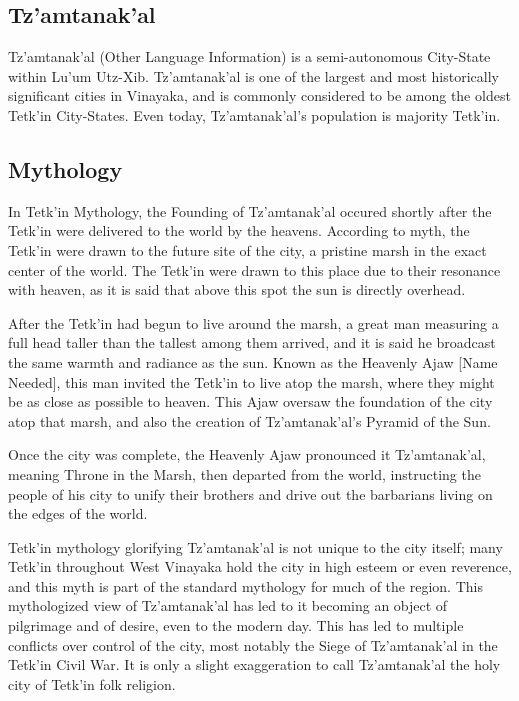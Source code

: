 \begin{multicols}{2}
	\section{Tz'amtanak'al}
		Tz'amtanak'al (Other Language Information) is a semi-autonomous City-State within Lu'um Utz-Xib. Tz'amtanak'al is one of the largest and most historically significant cities in Vinayaka, and is commonly considered to be among the oldest Tetk'in City-States. Even today, Tz'amtanak'al's population is majority Tetk'in.
		\subsection{Mythology}
		In Tetk'in Mythology, the Founding of Tz'amtanak'al occured shortly after the Tetk'in were delivered to the world by the heavens. According to myth, the Tetk'in were drawn to the future site of the city, a pristine marsh in the exact center of the world. The Tetk'in were drawn to this place due to their resonance with heaven, as it is said that above this spot the sun is directly overhead.\par
		After the Tetk'in had begun to live around the marsh, a great man measuring a full head taller than the tallest among them arrived, and it is said he broadcast the same warmth and radiance as the sun. Known as the Heavenly Ajaw [Name Needed], this man invited the Tetk'in to live atop the marsh, where they might be as close as possible to heaven. This Ajaw oversaw the foundation of the city atop that marsh, and also the creation of Tz'amtanak'al's Pyramid of the Sun. \par 
		Once the city was complete, the Heavenly Ajaw pronounced it Tz'amtanak'al, meaning Throne in the Marsh, then departed from the world, instructing the people of his city to unify their brothers and drive out the barbarians living on the edges of the world.\par
		Tetk'in mythology glorifying Tz'amtanak'al is not unique to the city itself; many Tetk'in throughout West Vinayaka hold the city in high esteem or even reverence, and this myth is part of the standard mythology for much of the region. This mythologized view of Tz'amtanak'al has led to it becoming an object of pilgrimage and of desire, even to the modern day. This has led to multiple conflicts over control of the city, most notably the Siege of Tz'amtanak'al in the Tetk'in Civil War. It is only a slight exaggeration to call Tz'amtanak'al the holy city of Tetk'in folk religion.		
\end{multicols}